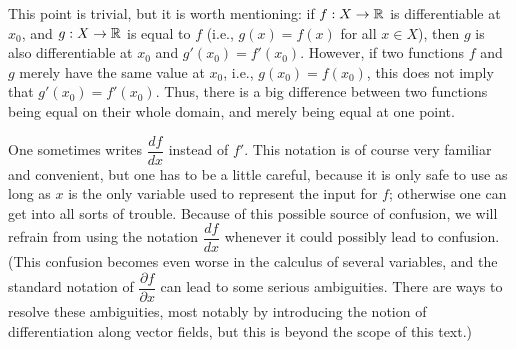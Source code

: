 \setcounter{thm}{3}
\begin{rmk}\label{i:10.1.4}
  This point is trivial, but it is worth mentioning:
  if \(f : X \to \mathbb{R}\) is differentiable at \(x_0\), and \(g : X \to \mathbb{R}\) is equal to \(f\) (i.e., \(g(x) = f(x)\) for all \(x \in X\)), then \(g\) is also differentiable at \(x_0\) and \(g'(x_0) = f'(x_0)\).
  However, if two functions \(f\) and \(g\) merely have the same value at \(x_0\), i.e., \(g(x_0) = f(x_0)\), this does not imply that \(g'(x_0) = f'(x_0)\).
  Thus, there is a big difference between two functions being equal on their whole domain, and merely being equal at one point.
\end{rmk}

\begin{rmk}\label{i:10.1.5}
  One sometimes writes \(\dfrac{df}{dx}\) instead of \(f'\).
  This notation is of course very familiar and convenient, but one has to be a little careful, because it is only safe to use as long as \(x\) is the only variable used to represent the input for \(f\);
  otherwise one can get into all sorts of trouble.
  Because of this possible source of confusion, we will refrain from using the notation \(\dfrac{df}{dx}\) whenever it could possibly lead to confusion.
  (This confusion becomes even worse in the calculus of several variables, and the standard notation of \(\dfrac{\partial f}{\partial x}\) can lead to some serious ambiguities.
  There are ways to resolve these ambiguities, most notably by introducing the notion of differentiation along vector fields, but this is beyond the scope of this text.)
\end{rmk}

